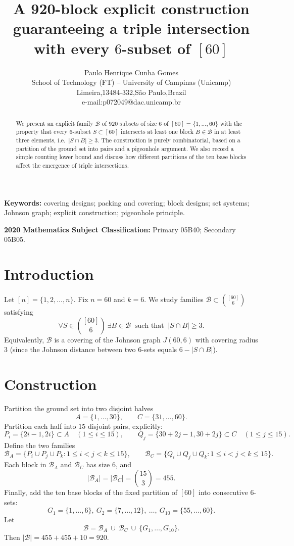 \documentclass[11pt]{article}
\title{A 920-block explicit construction guaranteeing a triple intersection with every $6$-subset of $[60]$}
\author{Paulo Henrique Cunha Gomes\\ School of Technology (FT) – University of Campinas (Unicamp)\\Limeira,13484-332,São Paulo,Brazil\\ e-mail:p072049@dac.unicamp.br}
\date{}
\newcommand{\bb}[2]{\binom{#1}{#2}}
\begin{document}
\maketitle

\begin{abstract}
We present an explicit family $\mathcal{B}$ of $920$ subsets of size $6$ of $[60]=\{1,\dots,60\}$
with the property that every $6$-subset $S\subset[60]$ intersects at least one block $B\in\mathcal{B}$
in at least three elements, i.e.\ $|S\cap B|\ge 3$.
The construction is purely combinatorial, based on a partition of the ground set into pairs and a
pigeonhole argument. We also record a simple counting lower bound and discuss how different
partitions of the ten base blocks affect the emergence of triple intersections.
\end{abstract}

\noindent\textbf{Keywords:} covering designs; packing and covering; block designs; set systems; Johnson graph; explicit construction; pigeonhole principle.

\noindent\textbf{2020 Mathematics Subject Classification:} Primary 05B40; Secondary 05B05.

\section{Introduction}
Let $[n]=\{1,2,\dots,n\}$. Fix $n=60$ and $k=6$. We study families
$\mathcal{B}\subset \bb{[60]}{6}$ satisfying
\[
\forall S\in \bb{[60]}{6}\ \exists B\in \mathcal{B}\ \text{ such that }\ |S\cap B|\ge 3.
\]
Equivalently, $\mathcal{B}$ is a covering of the Johnson graph $J(60,6)$ with covering radius $3$
(since the Johnson distance between two $6$-sets equals $6-|S\cap B|$).

\section{Construction}
Partition the ground set into two disjoint halves
\[
A=\{1,\dots,30\},\qquad C=\{31,\dots,60\}.
\]
Partition each half into $15$ disjoint pairs, explicitly:
\[
P_i=\{2i-1,2i\}\subset A\quad (1\le i\le 15),
\qquad
Q_j=\{30+2j-1,30+2j\}\subset C\quad (1\le j\le 15).
\]
Define the two families
\[
\mathcal{B}_A=\{P_i\cup P_j\cup P_k:1\le i<j<k\le 15\},
\qquad
\mathcal{B}_C=\{Q_i\cup Q_j\cup Q_k:1\le i<j<k\le 15\}.
\]
Each block in $\mathcal{B}_A$ and $\mathcal{B}_C$ has size $6$, and
\[
|\mathcal{B}_A|=|\mathcal{B}_C|=\bb{15}{3}=455.
\]
Finally, add the ten base blocks of the fixed partition of $[60]$ into consecutive $6$-sets:
\[
G_1=\{1,\dots,6\},\ G_2=\{7,\dots,12\},\ \dots,\ G_{10}=\{55,\dots,60\}.
\]
Let
\[
\mathcal{B}=\mathcal{B}_A\ \cup\ \mathcal{B}_C\ \cup\ \{G_1,\dots,G_{10}\}.
\]
Then $|\mathcal{B}|=455+455+10=920$.
\end{document}
